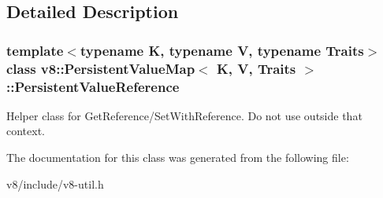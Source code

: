 \subsection{Detailed Description}
\subsubsection*{template$<$typename K, typename V, typename Traits$>$class v8\-::\-Persistent\-Value\-Map$<$ K, V, Traits $>$\-::\-Persistent\-Value\-Reference}

Helper class for Get\-Reference/\-Set\-With\-Reference. Do not use outside that context. 

The documentation for this class was generated from the following file\-:\begin{DoxyCompactItemize}
\item 
v8/include/v8-\/util.\-h\end{DoxyCompactItemize}
